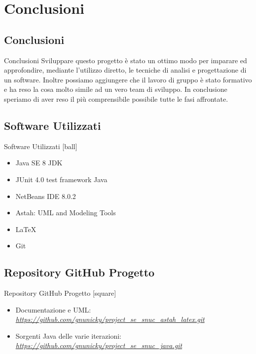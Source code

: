 \section {Conclusioni}
\subsection{Conclusioni}
 \begin{frame} {Conclusioni}
  Sviluppare questo progetto è stato un ottimo modo per imparare ed approfondire, mediante l'utilizzo diretto, le tecniche di analisi e progettazione di un software.   
  Inoltre possiamo aggiungere che il lavoro di gruppo è stato formativo e ha reso la cosa molto simile ad un vero team di sviluppo. In conclusione speriamo di aver 
  reso il più comprensibile possibile tutte le fasi affrontate.
 \end{frame}

\subsection{Software Utilizzati}
 \begin{frame} {Software Utilizzati}
  [ball]
  \begin{itemize} 
    \item Java SE 8 JDK
    \item JUnit 4.0 test framework Java
    \item NetBeans IDE 8.0.2 
    \item Astah: UML and Modeling Tools
    \item \LaTeX
    \item Git
   \end{itemize}
 \end{frame}

\subsection{Repository GitHub Progetto}
 \begin{frame} {Repository GitHub Progetto}
  [square]
  \begin{itemize} 
    \item Documentazione e UML: \emph{\url{https://github.com/gnunicky/project_se_snuc_astah_latex.git}}
    \item Sorgenti Java delle varie iterazioni: \emph{\url{https://github.com/gnunicky/project_se_snuc_java.git}}
   \end{itemize}
 \end{frame}


